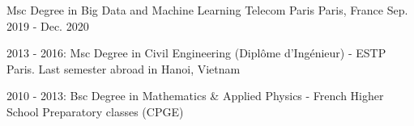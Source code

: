 

\begin{cventries}

  \cventry
    {Msc Degree in Big Data and Machine Learning} %
    {Telecom Paris} %
    {Paris, France} %
    {Sep. 2019 - Dec. 2020} %
    {
      \begin{cvitems} %
        \item {2013 - 2016: Msc Degree in Civil Engineering (Dipl\^ome d'Ing\'enieur) - ESTP Paris.  Last semester abroad in Hanoi, Vietnam}
        \item {2010 - 2013: Bsc Degree in Mathematics \& Applied Physics -  French Higher School Preparatory classes (CPGE)}
      \end{cvitems}
    }


\end{cventries}
